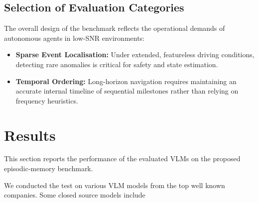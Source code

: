 \documentclass[journal]{IEEEtran}
\begin{document}
\begin{table}[!t]
\centering
\begingroup
\scriptsize
\setlength{\tabcolsep}{2pt}
\endgroup
\caption{Duration-stratified distribution of the 17 video sequences. Short: $t \leq 10$ min; medium: $10 < t \leq 15$ min; long: $t > 15$ min. The mean video duration is 1800~s (30~min), and the benchmark contains 422 QA pairs in total.}
\label{tab:duration_composition}
\end{table}
\FloatBarrier

\subsection{Selection of Evaluation Categories}
The overall design of the benchmark reflects the operational demands of autonomous agents in low-SNR environments:
\begin{itemize}
    \item \textbf{Sparse Event Localisation:} Under extended, featureless driving conditions, detecting rare anomalies is critical for safety and state estimation.
    \item \textbf{Temporal Ordering:} Long-horizon navigation requires maintaining an accurate internal timeline of sequential milestones rather than relying on frequency heuristics.
\end{itemize}

\section{Results}

This section reports the performance of the evaluated VLMs on the proposed episodic-memory benchmark.

We conducted the test on various VLM models from the top well known companies. Some closed source models include 

\appendices

\ifCLASSOPTIONcaptionsoff
  \newpage
\fi



\end{document}
